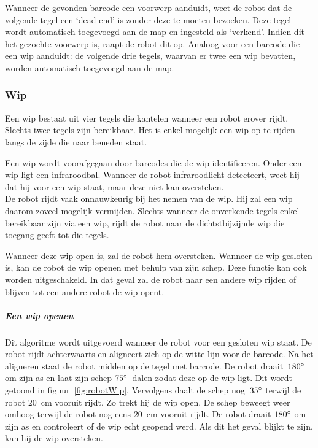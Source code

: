 \documentclass[eind]{penoverslag}
\begin{document}

Wanneer de gevonden barcode een voorwerp aanduidt, weet de robot dat de volgende tegel een `dead-end' is zonder deze te moeten bezoeken. Deze tegel wordt automatisch toegevoegd aan de map en ingesteld als `verkend'. Indien dit het gezochte voorwerp is, raapt de robot dit op.
Analoog voor een barcode die een wip aanduidt: de volgende drie tegels, waarvan er twee een wip bevatten, worden automatisch toegevoegd aan de map.


\subsubsection{Wip}
\label{sssec:AlgoWip}
Een wip bestaat uit vier tegels die kantelen wanneer een robot erover rijdt. Slechts twee tegels zijn bereikbaar. Het is enkel mogelijk een wip op te rijden langs de zijde die naar beneden staat.

Een wip wordt voorafgegaan door barcodes die de wip identificeren. Onder een wip ligt een infraroodbal. Wanneer de robot infraroodlicht detecteert, weet hij dat hij voor een wip staat, maar deze niet kan oversteken. \\

De robot rijdt vaak onnauwkeurig bij het nemen van de wip. Hij zal een wip daarom zoveel mogelijk vermijden. Slechts wanneer de onverkende tegels enkel bereikbaar zijn via een wip, rijdt de robot naar de dichtstbijzijnde wip die toegang geeft tot die tegels.

Wanneer deze wip open is, zal de robot hem oversteken. Wanneer de wip gesloten is, kan de robot de wip openen met behulp van zijn schep. Deze functie kan ook worden uitgeschakeld. In dat geval zal de robot naar een andere wip rijden of blijven tot een andere robot de wip opent.

\subparagraph{Een wip openen} 
Dit algoritme wordt uitgevoerd wanneer de robot voor een gesloten wip staat. De robot rijdt achterwaarts en aligneert zich op de witte lijn voor de barcode. Na het aligneren staat de robot midden op de tegel met barcode. De robot draait~$180\degree$ om zijn as en laat zijn schep $75\degree$~dalen zodat deze op de wip ligt. Dit wordt getoond in figuur~\ref{fig:robotWip}. Vervolgens daalt de schep nog~$35\degree$ terwijl de robot $20$~cm vooruit rijdt. Zo trekt hij de wip open. De schep beweegt weer omhoog terwijl de robot nog eens $20$~cm vooruit rijdt. De robot draait $180\degree$ om zijn as en controleert of de wip echt geopend werd. Als dit het geval blijkt te zijn, kan hij de wip oversteken.
\end{document}
